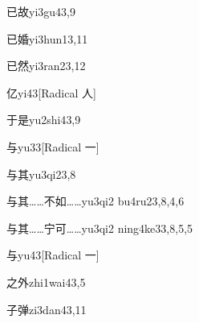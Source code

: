 \begin{verbete}{已故}{yi3gu4}{3,9}
\end{verbete}

\begin{verbete}{已婚}{yi3hun1}{3,11}
\end{verbete}

\begin{verbete}{已然}{yi3ran2}{3,12}
\end{verbete}

\begin{verbete}{亿}{yi4}{3}[Radical 人]
\end{verbete}

\begin{verbete}{于是}{yu2shi4}{3,9}
\end{verbete}

\begin{verbete}{与}{yu3}{3}[Radical 一]
\end{verbete}

\begin{verbete}{与其}{yu3qi2}{3,8}
\end{verbete}

\begin{verbete}{与其……不如……}{yu3qi2 bu4ru2}{3,8,4,6}
\end{verbete}

\begin{verbete}{与其……宁可……}{yu3qi2 ning4ke3}{3,8,5,5}
\end{verbete}

\begin{verbete}{与}{yu4}{3}[Radical 一]
\end{verbete}

\begin{verbete}{之外}{zhi1wai4}{3,5}
\end{verbete}

\begin{verbete}{子弹}{zi3dan4}{3,11}
\end{verbete}


